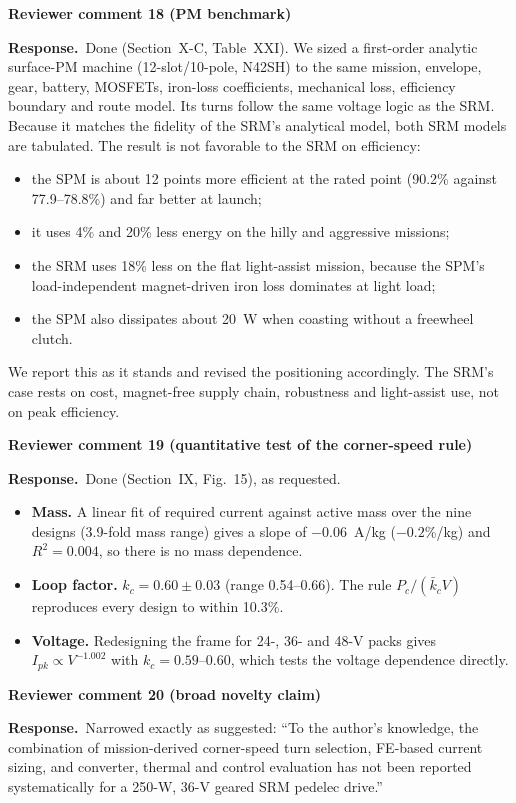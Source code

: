 \documentclass[10pt]{article}
\newcommand{\rev}[1]{\par\medskip\noindent\textbf{Reviewer comment #1}\par}
\newcommand{\resp}{\par\noindent\textcolor{blue!50!black}{\textbf{Response.}}~}
\begin{document}
\rev{18 (PM benchmark)}
\resp Done (Section~X-C, Table~XXI). We sized a first-order analytic surface-PM
machine (12-slot/10-pole, N42SH) to the same mission, envelope, gear, battery,
MOSFETs, iron-loss coefficients, mechanical loss, efficiency boundary and route
model. Its turns follow the same voltage logic as the SRM. Because it matches
the fidelity of the SRM's analytical model, both SRM models are tabulated. The
result is not favorable to the SRM on efficiency:
\begin{itemize}[nosep]
\item the SPM is about 12 points more efficient at the rated point (90.2\%
against 77.9--78.8\%) and far better at launch;
\item it uses 4\% and 20\% less energy on the hilly and aggressive missions;
\item the SRM uses 18\% less on the flat light-assist mission, because the
SPM's load-independent magnet-driven iron loss dominates at light load;
\item the SPM also dissipates about 20~W when coasting without a freewheel
clutch.
\end{itemize}
We report this as it stands and revised the positioning accordingly. The
SRM's case rests on cost, magnet-free supply chain, robustness and light-assist
use, not on peak efficiency.

\rev{19 (quantitative test of the corner-speed rule)}
\resp Done (Section~IX, Fig.~15), as requested.
\begin{itemize}[nosep]
\item \textbf{Mass.} A linear fit of required current against active mass over
the nine designs (3.9-fold mass range) gives a slope of $-0.06$~A/kg
($-0.2$\%/kg) and $R^2=0.004$, so there is no mass dependence.
\item \textbf{Loop factor.} $k_c=0.60\pm0.03$ (range 0.54--0.66). The rule
$P_c/(\bar k_cV)$ reproduces every design to within 10.3\%.
\item \textbf{Voltage.} Redesigning the frame for 24-, 36- and 48-V packs gives
$I_{pk}\propto V^{-1.002}$ with $k_c=0.59$--$0.60$, which tests the voltage
dependence directly.
\end{itemize}

\rev{20 (broad novelty claim)}
\resp Narrowed exactly as suggested: ``To the author's knowledge, the
combination of mission-derived corner-speed turn selection, FE-based current
sizing, and converter, thermal and control evaluation has not been reported
systematically for a 250-W, 36-V geared SRM pedelec drive.''
\end{document}
